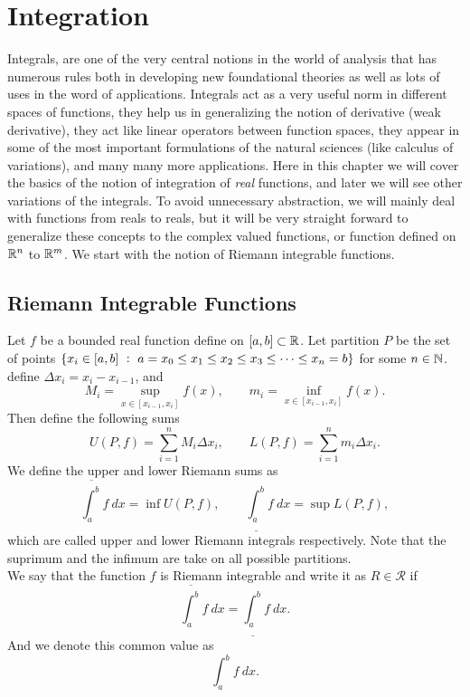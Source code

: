 \chapter{Integration}

Integrals, are one of the very central notions in the world of analysis that has numerous rules both in developing new foundational theories as well as lots of uses in the word of applications. Integrals act as a very useful norm in different spaces of functions, they help us in generalizing the notion of derivative (weak derivative), they act like linear operators between function spaces, they appear in some of the most important formulations of the natural sciences (like calculus of variations), and many many more applications. Here in this chapter we will cover the basics of the notion of integration of \emph{real} functions, and later we will see other variations of the integrals. To avoid unnecessary abstraction, we will mainly deal with functions from reals to reals, but it will be very straight forward to generalize these concepts to the complex valued functions, or function defined on $\mathbb{R}^n$ to $\mathbb{R}^m$. We start with the notion of Riemann integrable functions.

\section{Riemann Integrable Functions}
\begin{definition}
	Let $f$ be a bounded real function define on $[a,b] \subset \mathbb{R}$. Let partition $P$ be the set of points $\set{x_i \in [a,b]\ :\ a=x_0 \leq x_1\leq x_2\leq x_3\leq \cdots \leq x_n=b}$ for some $n\in \mathbb{N}$. define $\Delta x_i = x_{i} - x_{i-1}$, and
	\[ M_i = \sup_{x\in[x_{i-1},x_{i}]}f(x), \qquad m_i = \inf_{x\in[x_{i-1},x_{i}]}f(x). \]
	Then define the following sums
	\[ U(P,f) = \sum_{i=1}^{n} M_i \Delta x_i, \qquad L(P,f) = \sum_{i=1}^{n}  m_i \Delta x_i.\]
	We define the upper and lower Riemann sums as
	\[ \overline{\int_a^b} f\ dx = \inf U(P,f), \qquad \underline{\int_a^b} f\ dx = \sup L(P,f),
	 \]
	which are called upper and lower Riemann integrals respectively. Note that the suprimum and the infimum are take on all possible partitions. \\
	We say that the function $f$ is Riemann integrable and write it as $R \in\mathcal{R}$ if 
	\[ \overline{\int_a^b} f\ dx = \underline{\int_a^b} f\ dx . \]
	And we denote this common value as
	\[ \int_a^b f\ dx. \]
\end{definition}

